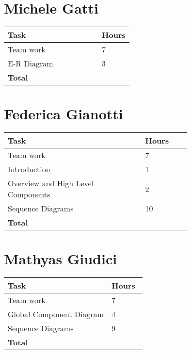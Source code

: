\section{Michele Gatti}

\smallskip
\begin{center}
\begin{tabular}{ | p{0.75\linewidth} | l | }
  \hline
    \textbf{Task} & \textbf{Hours }\\ \hline
     Team work & 7 \\ \hline
     E-R Diagram & 3 \\ \hline
    \textbf{Total} & \textbf{} \\ \hline
\end{tabular}
\end{center}
\smallskip


\section{Federica Gianotti}

\smallskip
\begin{center}
\begin{tabular}{ | p{0.75\linewidth} | l | }
  \hline
    \textbf{Task} & \textbf{Hours }\\ \hline
    Team work & 7 \\ \hline
    Introduction & 1 \\ \hline
    Overview and High Level Components & 2 \\ \hline
    Sequence Diagrams & 10 \\ \hline
   \textbf{Total} & \textbf{} \\ \hline
\end{tabular}
\end{center}
\smallskip

\section{Mathyas Giudici}

\smallskip
\begin{center}
\begin{tabular}{ | p{0.75\linewidth} | l | }
  \hline
    \textbf{Task} & \textbf{Hours }\\ \hline
    Team work & 7 \\ \hline
    Global Component Diagram & 4 \\ \hline
    Sequence Diagrams & 9 \\ \hline
   \textbf{Total} & \textbf{} \\ \hline
\end{tabular}
\end{center}

\clearpage
